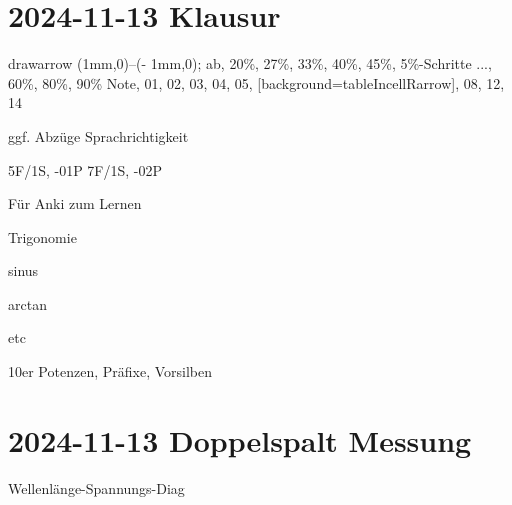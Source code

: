 \section{2024-11-13 Klausur}

\startplacetable[location={here},title={Noten}]
	drawarrow (1mm,0)--(\overlaywidth - 1mm,0);
\stopuseMPgraphic
{}
\setupTABLE[each][offset=1mm,frame=off]
\setupTABLE[c][1][background=color,backgroundcolor=gray,rightframe=on]
\setupTABLE[r][2][topframe=on]
\bTABLE
\startCSV
ab, 20\%, 27\%, 33\%, 40\%, 45\%, 5\%-Schritte ..., 60\%, 80\%, 90\%
Note, 01, 02, 03, 04, 05, [background=tableIncellRarrow], 08, 12, 14
\stopCSV
\eTABLE
\stopplacetable

ggf. Abzüge Sprachrichtigkeit

\startplacetable[location={here},title={Abzüge Sprachrichtigkeit}]
\setupTABLE[each][offset=1mm,frame=off]
\setupTABLE[c][1][background=color,backgroundcolor=gray,rightframe=on]
\setupTABLE[r][2][topframe=on]
\bTABLE
\startCSV
5F/1S, -01P
7F/1S, -02P
\stopCSV
\eTABLE
\stopplacetable

\startframedtipp
Für Anki zum Lernen

\startitemize[packed]
\item Trigonomie
\startitemize[packed]
\item sinus
\item arctan
\item etc
\stopitemize
\item 10er Potenzen, Präfixe, Vorsilben
\stopitemize
\stopframedtipp

\section{2024-11-13 Doppelspalt Messung}

Wellenlänge-Spannungs-Diag

